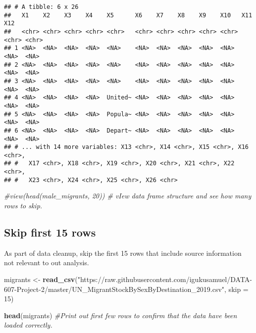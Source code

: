 \documentclass[]{article}
\newenvironment{Shaded}{\begin{snugshade}}{\end{snugshade}}
\newcommand{\KeywordTok}[1]{\textcolor[rgb]{0.13,0.29,0.53}{\textbf{#1}}}
\newcommand{\DataTypeTok}[1]{\textcolor[rgb]{0.13,0.29,0.53}{#1}}
\newcommand{\DecValTok}[1]{\textcolor[rgb]{0.00,0.00,0.81}{#1}}
\newcommand{\StringTok}[1]{\textcolor[rgb]{0.31,0.60,0.02}{#1}}
\newcommand{\CommentTok}[1]{\textcolor[rgb]{0.56,0.35,0.01}{\textit{#1}}}
\newcommand{\NormalTok}[1]{#1}
\begin{document}
\begin{verbatim}
## # A tibble: 6 x 26
##   X1    X2    X3    X4    X5      X6    X7    X8    X9    X10   X11   X12  
##   <chr> <chr> <chr> <chr> <chr>   <chr> <chr> <chr> <chr> <chr> <chr> <chr>
## 1 <NA>  <NA>  <NA>  <NA>  <NA>    <NA>  <NA>  <NA>  <NA>  <NA>  <NA>  <NA> 
## 2 <NA>  <NA>  <NA>  <NA>  <NA>    <NA>  <NA>  <NA>  <NA>  <NA>  <NA>  <NA> 
## 3 <NA>  <NA>  <NA>  <NA>  <NA>    <NA>  <NA>  <NA>  <NA>  <NA>  <NA>  <NA> 
## 4 <NA>  <NA>  <NA>  <NA>  United~ <NA>  <NA>  <NA>  <NA>  <NA>  <NA>  <NA> 
## 5 <NA>  <NA>  <NA>  <NA>  Popula~ <NA>  <NA>  <NA>  <NA>  <NA>  <NA>  <NA> 
## 6 <NA>  <NA>  <NA>  <NA>  Depart~ <NA>  <NA>  <NA>  <NA>  <NA>  <NA>  <NA> 
## # ... with 14 more variables: X13 <chr>, X14 <chr>, X15 <chr>, X16 <chr>,
## #   X17 <chr>, X18 <chr>, X19 <chr>, X20 <chr>, X21 <chr>, X22 <chr>,
## #   X23 <chr>, X24 <chr>, X25 <chr>, X26 <chr>
\end{verbatim}

\begin{Shaded}
\begin{Highlighting}[]
\CommentTok{#view(head(male_migrants, 20)) # vIew data frame structure and see how many rows to skip.}
\end{Highlighting}
\end{Shaded}

\subsection{Skip first 15 rows}\label{skip-first-15-rows}

As part of data cleanup, skip the first 15 rows that include source
information not relevant to out analysis.

\begin{Shaded}
\begin{Highlighting}[]
\NormalTok{migrants <-}\StringTok{ }\KeywordTok{read_csv}\NormalTok{(}\StringTok{"https://raw.githubusercontent.com/igukusamuel/DATA-607-Project-2/master/UN_MigrantStockBySexByDestination_2019.csv"}\NormalTok{, }\DataTypeTok{skip =} \DecValTok{15}\NormalTok{)}

\KeywordTok{head}\NormalTok{(migrants) }\CommentTok{#Print out first few rows to confirm that the data have been loaded correctly.}
\end{Highlighting}
\end{Shaded}
\end{document}
